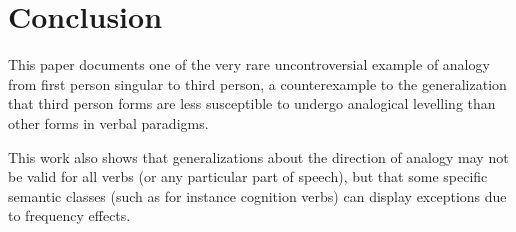\documentclass[oneside,a4paper,11pt]{article}
\begin{document}
\section{Conclusion}
This paper documents one of the very rare uncontroversial example of analogy from first person singular to third person, a counterexample to the generalization that third person forms are less susceptible to undergo analogical levelling than other forms in verbal paradigms.
 
This work also shows that generalizations about the direction of analogy may not be valid for all verbs (or any particular part of speech), but that some specific semantic classes (such as for instance cognition verbs) can display exceptions due to frequency effects. 
 



 \tableofcontents
\end{document}
